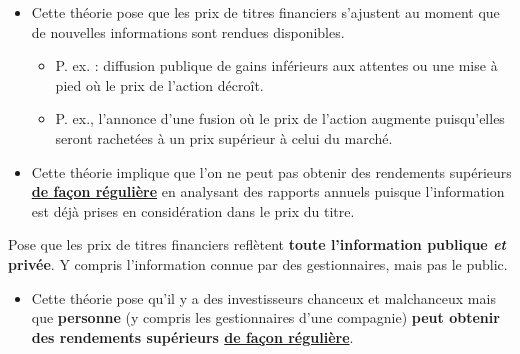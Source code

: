 \documentclass[10pt, french]{article}
\begin{document}
\begin{multicols*}{2}
\begin{definitionNOHFILLsub}
\begin{itemize}
	\item	Cette théorie pose que les prix de titres financiers s'ajustent au moment que de nouvelles informations sont rendues disponibles.
		\begin{itemize}
		\item	P. ex. : diffusion publique de gains inférieurs aux attentes ou une mise à pied où le prix de l'action décroît.
		\item	P. ex., l'annonce d'une fusion où le prix de l'action augmente puisqu'elles seront rachetées à un prix supérieur à celui du marché.
		\end{itemize}
	\item	Cette théorie implique que l'on ne peut pas obtenir des rendements supérieurs \underline{\textbf{de façon régulière}} en analysant des rapports annuels puisque l'information est déjà prises en considération dans le prix du titre.
\end{itemize}
\end{definitionNOHFILLsub}


\begin{definitionNOHFILLsub}
Pose que les prix de titres financiers reflètent \textbf{toute l'information publique \textit{et} privée}. Y compris l'information connue par des gestionnaires, mais pas le public.

\begin{itemize}
	\item	Cette théorie pose qu'il y a des investisseurs chanceux et malchanceux mais que \textbf{personne} (y compris les gestionnaires d'une compagnie) \textbf{peut obtenir des rendements supérieurs \underline{de façon régulière}}.
\end{itemize}
\end{definitionNOHFILLsub}


\end{multicols*}
\end{document}
